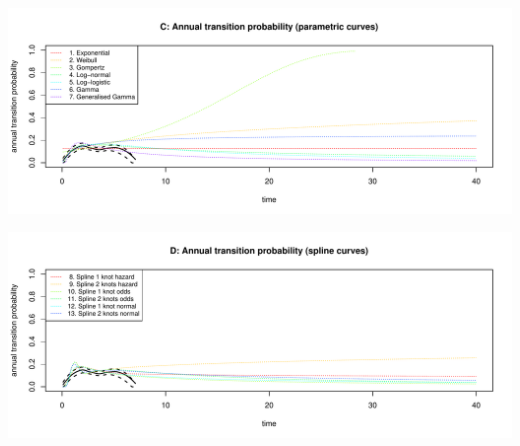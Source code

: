 \documentclass[]{article}
\begin{document}
\begin{flushleft}\includegraphics[height=0.29\textheight]{images/validate_extrapolation2-3} \end{flushleft}

\begin{flushleft}\includegraphics[height=0.29\textheight]{images/validate_extrapolation2-4} \end{flushleft}
\end{document}
